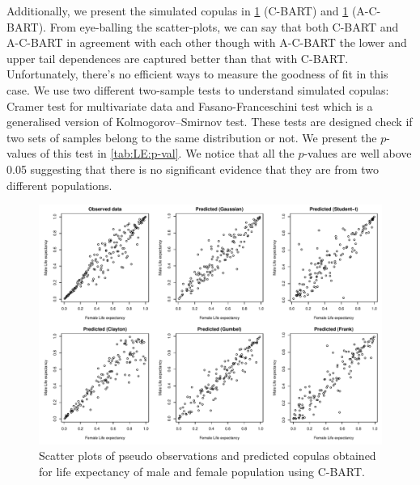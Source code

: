\documentclass{amsart}
\begin{document}
Additionally, we present the simulated copulas in \cref{fig:pseudo:LE:woa} (C-BART) and \cref{fig:pseudo:LE:woa} (A-C-BART). From eye-balling the scatter-plots, we can say that both C-BART and A-C-BART in agreement with each other though with A-C-BART the lower and upper tail dependences are captured better than that with C-BART. Unfortunately, there's no efficient ways to measure the goodness of fit in this case. We use two different two-sample tests to understand simulated copulas: Cramer test for multivariate data \cite{BARINGHAUS2004190} and Fasano-Franceschini test \cite{fasano-franceschini} which is a generalised version of Kolmogorov–Smirnov test. These tests are designed check if two sets of samples belong to the same distribution or not. We present the $p$-values of this test in \cref{tab:LE:p-val}. We notice that all the $p$-values are well above 0.05 suggesting that there is no significant evidence that they are from two different populations.


\begin{figure}
	\centering
	\includegraphics[width = 0.95\linewidth]{"LE_vs_GDP_woa.pdf"}
	\caption{Scatter plots of pseudo observations and predicted copulas obtained for life expectancy of male and female population using C-BART.}
	\label{fig:pseudo:LE:woa}
\end{figure}
\end{document}
